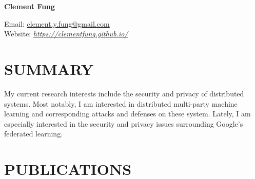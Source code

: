 \documentclass[10pt]{res} %
\begin{document}
{\huge \bf Clement Fung} \hfill 

Email: \href{mailto:clement.y.fung@gmail.com}{\underline{clement.y.fung@gmail.com}} \\ 
Website: \href{https://clementfung.github.io/}{\emph{https://clementfung.github.io/}} \\


\section{SUMMARY}

\vspace{0.2in} %

My current research interests include the security and privacy of distributed systems. Most notably, I am interested in distributed multi-party machine learning and corresponding attacks and defenses on these system. Lately, I am especially interested in the security and privacy issues surrounding Google's federated learning.


\section{PUBLICATIONS}

\vspace{0.2in} %
\end{document}
